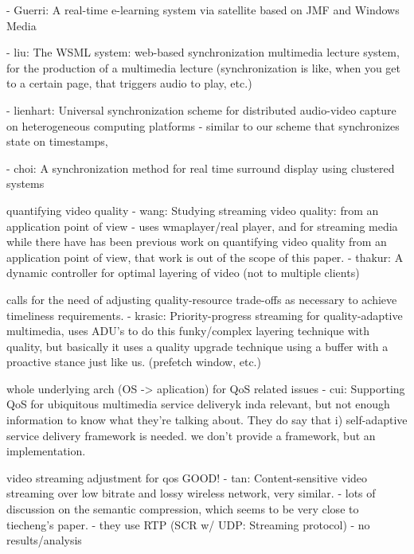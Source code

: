\documentclass{sig-alternate}
\begin{document}
- Guerri: A real-time e-learning system via satellite based on JMF and Windows Media

- liu: The WSML system: web-based synchronization multimedia lecture system, for
the production of a multimedia lecture (synchronization is like, when you
get to a certain page, that triggers audio to play, etc.)


- lienhart: Universal synchronization scheme for distributed audio-video capture on heterogeneous computing platforms 
- similar to our scheme that synchronizes state on timestamps, 

- choi: A synchronization method for real time surround display using clustered systems


quantifying video quality
- wang: Studying streaming video quality: from an application point of view
- uses wmaplayer/real player, and for streaming media
while there have has been previous work on quantifying video quality from
an application point of view, that work is out of the scope of this
paper.  
- thakur: A dynamic controller for optimal layering of video (not to multiple clients)

calls for the need of adjusting quality-resource trade-offs as
necessary to achieve timeliness requirements.
- krasic: Priority-progress streaming for quality-adaptive multimedia, 
uses ADU's to do this funky/complex layering technique with quality, 
but basically it uses a quality upgrade technique using a buffer
with a proactive stance just like us.  (prefetch window, etc.)

whole underlying arch (OS -> aplication) for QoS related issues
- cui: Supporting QoS for ubiquitous multimedia service deliveryk
inda relevant, but not enough information to know what they're talking
about.  They do say that i) self-adaptive service delivery framework
is needed.  we don't provide a framework, but an implementation.

video streaming adjustment for qos
GOOD! - tan: Content-sensitive video streaming over low bitrate and
lossy wireless network, very similar. 
- lots of discussion on the semantic compression, which seems to
be very close to tiecheng's paper.
- they use RTP (SCR w/ UDP: Streaming protocol)
- no results/analysis
\end{document}
